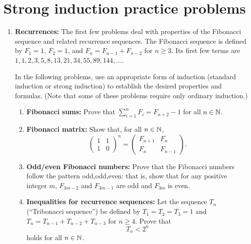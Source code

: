 



\section{Strong induction practice problems}\label{strong_induction_practice} 


\begin{enumerate}




\item \textbf{Recurrences:} 
The first  few problems deal with properties of the Fibonacci sequence
and related recurrence sequences.
The Fibonacci sequence is defined by $F_1=1$, $F_2=1$, and
$F_n=F_{n-1}+F_{n-2}$ for $n\ge 3$. Its first few terms are
$1,1,2,3,5,8,13,21,34,55,89,144,\dots$.

In the following problems, use an appropriate form of
induction (standard induction or strong induction) 
to establish the desired properties and formulas. (Note that
some of these problems require only ordinary induction.)

\begin{enumerate}

\item 
\textbf{Fibonacci sums:}
Prove that $\sum_{i=1}^n F_i=F_{n+2}-1$ for all $n\in\mathbb{N}$.

\item 
\textbf{Fibonacci matrix:}
\newcommand{\mat}[4]{\begin{pmatrix}#1 & #2 \\ #3 & #4\end{pmatrix}}
Show that, for all $n\in\mathbb{N}$, 
\[
\tag{$P(n)$}
\mat 1110^n
=\mat
{F_{n+1}}{F_n}
{F_n}{F_{n-1}}.
\]


\item \textbf{Odd/even Fibonacci numbers:}
Prove that the Fibonacci numbers follow the pattern odd,odd,even:
that is, show that for any positive integer $m$, 
$F_{3m-2}$ and $F_{3m-1}$ are odd and $F_{3m}$ is even.


\item
\textbf{Inequalities for recurrence sequences:}
Let the sequence $T_n$ (``Tribonacci sequence'')
be defined by $T_1=T_2=T_3=1$ and $T_n=T_{n-1}+T_{n-2}+T_{n-3}$ for
$n\ge4$.  Prove that  
\[
T_n<2^n
\tag{$P(n)$}
\]
holds for all $n\in\mathbb{N}$.



\end{enumerate}
\end{enumerate}
